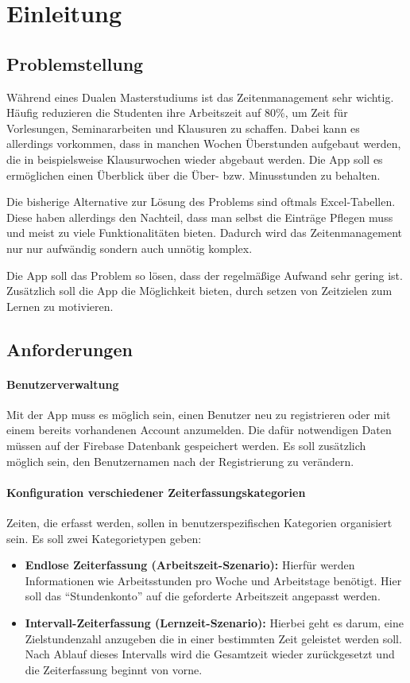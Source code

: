 \section{Einleitung}\label{sec:einleitung}
\subsection{Problemstellung}
Während eines Dualen Masterstudiums ist das Zeitenmanagement sehr wichtig. Häufig reduzieren die Studenten
ihre Arbeitszeit auf 80\%, um Zeit für Vorlesungen, Seminararbeiten und Klausuren zu schaffen.
Dabei kann es allerdings vorkommen, dass in manchen Wochen Überstunden aufgebaut werden, die in beispielsweise
Klausurwochen wieder abgebaut werden. Die App soll es ermöglichen einen Überblick über die
Über- bzw. Minusstunden zu behalten.

Die bisherige Alternative zur Lösung des Problems sind oftmals Excel-Tabellen.
Diese haben allerdings den Nachteil, dass man selbst die Einträge Pflegen muss und meist zu viele Funktionalitäten bieten.
Dadurch wird das Zeitenmanagement nur nur aufwändig sondern auch unnötig komplex.

Die App soll das Problem so lösen, dass der regelmäßige Aufwand sehr gering ist. Zusätzlich soll die App die Möglichkeit bieten,
durch setzen von Zeitzielen zum Lernen zu motivieren.

\subsection{Anforderungen}
\paragraph{Benutzerverwaltung}
Mit der App muss es möglich sein, einen Benutzer neu zu registrieren oder mit einem bereits
vorhandenen Account anzumelden.
Die dafür notwendigen Daten müssen auf der Firebase Datenbank gespeichert werden.
Es soll zusätzlich möglich sein, den Benutzernamen nach der Registrierung zu verändern.
\paragraph{Konfiguration verschiedener Zeiterfassungskategorien}
Zeiten, die erfasst werden, sollen in benutzerspezifischen Kategorien organisiert sein.
Es soll zwei Kategorietypen geben:
\begin{itemize}
    \item \textbf{Endlose Zeiterfassung (Arbeitszeit-Szenario):} Hierfür werden
    Informationen wie Arbeitsstunden pro Woche und Arbeitstage benötigt.
    Hier soll das \enquote{Stundenkonto} auf die geforderte Arbeitszeit angepasst werden.
    \item \textbf{Intervall-Zeiterfassung (Lernzeit-Szenario):} Hierbei geht es darum, eine
    Zielstundenzahl anzugeben die in einer bestimmten Zeit geleistet werden soll. Nach Ablauf dieses Intervalls
    wird die Gesamtzeit wieder zurückgesetzt und die Zeiterfassung beginnt von vorne.
\end{itemize}
